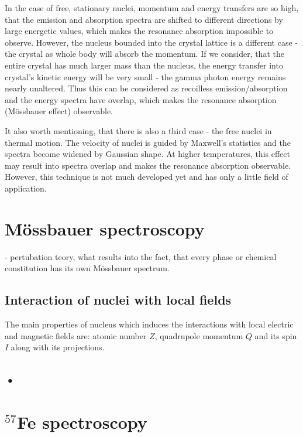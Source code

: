 \par
In the case of free, stationary nuclei, momentum and energy transfers are so high, that the emission and absorption spectra are shifted to different directions by large energetic values, which makes the resonance absorption impossible to observe. However, the nucleus bounded into the crystal lattice is a different case - the crystal as whole body will absorb the momentum. If we consider, that the entire crystal has much larger mass than the nucleus, the energy transfer into crystal's kinetic energy will be very small - the gamma photon energy remains nearly unaltered. Thus this can be considered as recoilless emission/absorption and the energy spectra have overlap, which makes the resonance absorption (Mössbauer effect) observable.
\par
It also worth mentioning, that there is also a third case - the free nuclei in thermal motion. The velocity of nuclei is guided by Maxwell's statistics and the spectra become widened by Gaussian shape. At higher temperatures, this effect may result into spectra overlap and makes the resonance absorption observable. However, this technique is not much developed yet and has only a little field of application.

\section{Mössbauer spectroscopy}

 - pertubation teory, what results into the fact, that every phase or chemical constitution has its own Mössbauer spectrum.


\subsection{Interaction of nuclei with local fields}
The main properties of nucleus which induces the interactions with local electric and magnetic fields are: atomic number $Z$, quadrupole momentum $Q$ and its spin $I$ along with its projections.


\subsection*{•}

\section{$^{57}$Fe spectroscopy}

